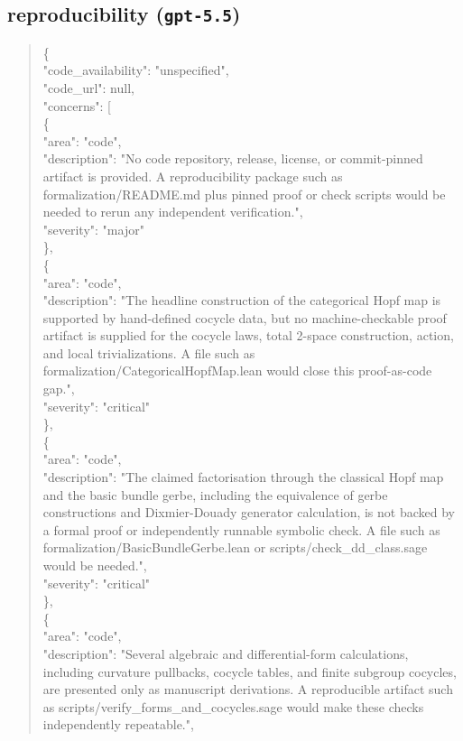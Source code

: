 \documentclass[11pt]{article}
\begin{document}
\subsection*{reproducibility (\texttt{gpt-5.5})}
\begin{quote}\small\ttfamily\raggedright
\{\\
  "code\_availability": "unspecified",\\
  "code\_url": null,\\
  "concerns": [\\
    \{\\
      "area": "code",\\
      "description": "No code repository, release, license, or commit-pinned artifact is provided. A reproducibility package such as formalization/README.md plus pinned proof or check scripts would be needed to rerun any independent verification.",\\
      "severity": "major"\\
    \},\\
    \{\\
      "area": "code",\\
      "description": "The headline construction of the categorical Hopf map is supported by hand-defined cocycle data, but no machine-checkable proof artifact is supplied for the cocycle laws, total 2-space construction, action, and local trivializations. A file such as formalization/CategoricalHopfMap.lean would close this proof-as-code gap.",\\
      "severity": "critical"\\
    \},\\
    \{\\
      "area": "code",\\
      "description": "The claimed factorisation through the classical Hopf map and the basic bundle gerbe, including the equivalence of gerbe constructions and Dixmier-Douady generator calculation, is not backed by a formal proof or independently runnable symbolic check. A file such as formalization/BasicBundleGerbe.lean or scripts/check\_dd\_class.sage would be needed.",\\
      "severity": "critical"\\
    \},\\
    \{\\
      "area": "code",\\
      "description": "Several algebraic and differential-form calculations, including curvature pullbacks, cocycle tables, and finite subgroup cocycles, are presented only as manuscript derivations. A reproducible artifact such as scripts/verify\_forms\_and\_cocycles.sage would make these checks independently repeatable.",\\

\end{quote}
\end{document}
